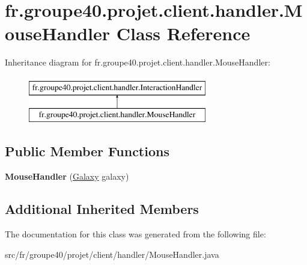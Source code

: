 \hypertarget{classfr_1_1groupe40_1_1projet_1_1client_1_1handler_1_1_mouse_handler}{}\section{fr.\+groupe40.\+projet.\+client.\+handler.\+Mouse\+Handler Class Reference}
\label{classfr_1_1groupe40_1_1projet_1_1client_1_1handler_1_1_mouse_handler}
Inheritance diagram for fr.\+groupe40.\+projet.\+client.\+handler.\+Mouse\+Handler\+:\begin{figure}[H]
\begin{center}
\leavevmode
\includegraphics[height=2.000000cm]{classfr_1_1groupe40_1_1projet_1_1client_1_1handler_1_1_mouse_handler}
\end{center}
\end{figure}
\subsection*{Public Member Functions}
\begin{DoxyCompactItemize}
\item 
\mbox{\label{classfr_1_1groupe40_1_1projet_1_1client_1_1handler_1_1_mouse_handler_a09fd96d03602181760cb2a07d417d3e0}} 
{\bfseries Mouse\+Handler} (\hyperlink{classfr_1_1groupe40_1_1projet_1_1model_1_1board_1_1_galaxy}{Galaxy} galaxy)
\end{DoxyCompactItemize}
\subsection*{Additional Inherited Members}


The documentation for this class was generated from the following file\+:\begin{DoxyCompactItemize}
\item 
src/fr/groupe40/projet/client/handler/Mouse\+Handler.\+java\end{DoxyCompactItemize}
